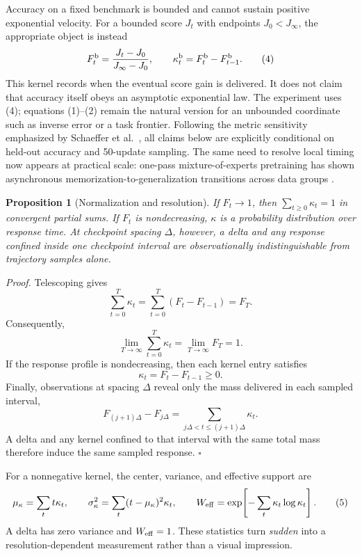 \documentclass[10pt]{article}
\theoremstyle{compact}
\newtheorem{proposition}{Proposition}
\begin{document}
Accuracy on a fixed benchmark is bounded and cannot sustain positive
exponential velocity. For a bounded score \(J_t\) with endpoints
\(J_0<J_\infty\), the appropriate object is instead
\[
F_t^{\rm b}=\frac{J_t-J_0}{J_\infty-J_0},
\qquad
\kappa_t^{\rm b}=F_t^{\rm b}-F_{t-1}^{\rm b}.
\tag{4}
\]
This kernel records when the eventual score gain is delivered. It does not
claim that accuracy itself obeys an asymptotic exponential law. The
experiment uses (4); equations (1)--(2) remain the natural version for an
unbounded coordinate such as inverse error or a task frontier. Following the
metric sensitivity emphasized by Schaeffer et al.~\cite{schaeffer2023}, all
claims below are explicitly conditional on held-out accuracy and 50-update
sampling.
The same need to resolve local timing now appears at practical scale: one-pass
mixture-of-experts pretraining has shown asynchronous memorization-to-generalization
transitions across data groups \cite{li2026}.

\begin{proposition}[Normalization and resolution]
If \(F_t\to1\), then \(\sum_{t\ge0}\kappa_t=1\) in convergent partial sums.
If \(F_t\) is nondecreasing, \(\kappa\) is a probability distribution over
response time. At checkpoint spacing \(\Delta\), however, a delta and any
response confined inside one checkpoint interval are observationally
indistinguishable from trajectory samples alone.
\end{proposition}

\emph{Proof.}
Telescoping gives
\[
\sum_{t=0}^{T}\kappa_t
=\sum_{t=0}^{T}(F_t-F_{t-1})
=F_T.
\]
Consequently,
\[
\lim_{T\to\infty}\sum_{t=0}^{T}\kappa_t
=\lim_{T\to\infty}F_T
=1.
\]
If the response profile is nondecreasing, then each kernel entry satisfies
\[
\kappa_t=F_t-F_{t-1}\ge0.
\]
Finally, observations at spacing \(\Delta\) reveal only the mass delivered in
each sampled interval,
\[
F_{(j+1)\Delta}-F_{j\Delta}
=\sum_{j\Delta<t\le (j+1)\Delta}\kappa_t.
\]
A delta and any kernel confined to that interval with the same total mass
therefore induce the same sampled response. \hfill\(\square\)

For a nonnegative kernel, the center, variance, and effective support are
\[
\mu_\kappa=\sum_t t\kappa_t,\qquad
\sigma_\kappa^2=\sum_t(t-\mu_\kappa)^2\kappa_t,\qquad
W_{\rm eff}=\exp\!\left[-\sum_t\kappa_t\log\kappa_t\right].
\tag{5}
\]
A delta has zero variance and \(W_{\rm eff}=1\). These statistics turn
\emph{sudden} into a resolution-dependent measurement rather than a visual
impression.
\end{document}
